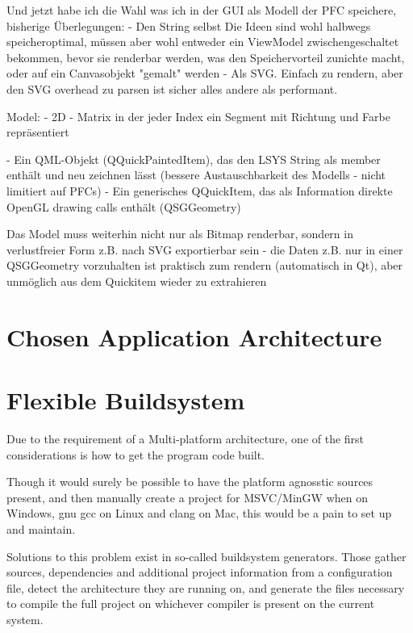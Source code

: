 Und jetzt habe ich die Wahl was ich in der GUI als Modell der PFC speichere, bisherige Überlegungen:
- Den String selbst
Die Ideen sind wohl halbwegs speicheroptimal, müssen aber wohl entweder ein ViewModel zwischengeschaltet bekommen, bevor sie renderbar werden, was den Speichervorteil zunichte macht, oder auf ein Canvasobjekt "gemalt" werden
- Als SVG. Einfach zu rendern, aber den SVG overhead zu parsen ist sicher alles andere als performant.

Model: - 2D - Matrix in der jeder Index ein Segment mit Richtung und Farbe repräsentiert

- Ein QML-Objekt (QQuickPaintedItem), das den LSYS String als member enthält und neu zeichnen lässt (bessere Austauschbarkeit des Modells - nicht limitiert auf PFCs)
- Ein generisches QQuickItem, das als Information direkte OpenGL drawing calls enthält (QSGGeometry)

Das Model muss weiterhin nicht nur als Bitmap renderbar, sondern in verlustfreier Form z.B. nach SVG exportierbar sein - die Daten z.B. nur in einer QSGGeometry vorzuhalten ist praktisch zum rendern (automatisch in Qt), aber unmöglich aus dem Quickitem wieder zu extrahieren


\section{Chosen Application Architecture}




\section{Flexible Buildsystem}
Due to the requirement of a Multi-platform architecture, one of the first considerations is how to get the program code built.

Though it would surely be possible to have the platform agnosstic sources present, and then manually create a project for MSVC/MinGW when on Windows, gnu gcc on Linux and clang on Mac, this would be a pain to set up and maintain.

Solutions to this problem exist in so-called buildsystem generators. Those gather sources, dependencies and additional project information from a configuration file, detect the architecture they are running on, and generate the files necessary to compile the full project on whichever compiler is present on the current system.

